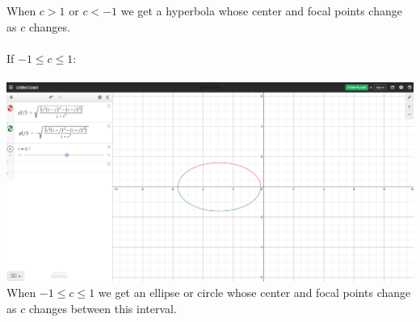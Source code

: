 \documentclass[10pt]{article}
\begin{document}
When $c>1$ or $c<-1$ we get a hyperbola whose center and focal points change as $c$ changes.\\\\
If $-1\leq c\leq1$:\\\\
\includegraphics[width=\textwidth]{Figure5}\\
When $-1\leq c \leq 1$ we get an ellipse or circle whose center and focal points change as $c$ changes between this interval.
\end{document}
